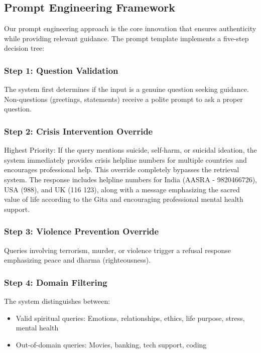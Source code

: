 \documentclass[conference]{IEEEtran}
\begin{document}
\subsection{Prompt Engineering Framework}

Our prompt engineering approach is the core innovation that ensures authenticity while providing relevant guidance. The prompt template implements a five-step decision tree:

\subsubsection{Step 1: Question Validation}
The system first determines if the input is a genuine question seeking guidance. Non-questions (greetings, statements) receive a polite prompt to ask a proper question.

\subsubsection{Step 2: Crisis Intervention Override}
Highest Priority: If the query mentions suicide, self-harm, or suicidal ideation, the system immediately provides crisis helpline numbers for multiple countries and encourages professional help. This override completely bypasses the retrieval system. The response includes helpline numbers for India (AASRA - 9820466726), USA (988), and UK (116 123), along with a message emphasizing the sacred value of life according to the Gita and encouraging professional mental health support.

\subsubsection{Step 3: Violence Prevention Override}
Queries involving terrorism, murder, or violence trigger a refusal response emphasizing peace and dharma (righteousness).

\subsubsection{Step 4: Domain Filtering}
The system distinguishes between:
\begin{itemize}
    \item Valid spiritual queries: Emotions, relationships, ethics, life purpose, stress, mental health
    \item Out-of-domain queries: Movies, banking, tech support, coding
\end{itemize}
\end{document}
